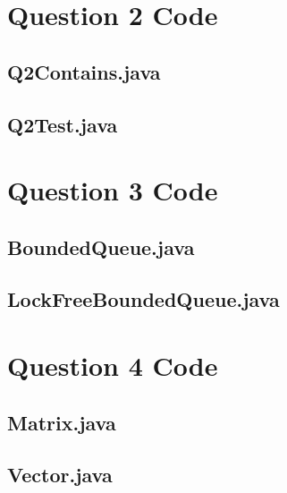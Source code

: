 \documentclass{article}%
\begin{document}
\newpage  
\begin{appendices}
    \section{Question 2 Code}\label{q2}
    
        \subsection*{Q2Contains.java}\label{q2-contains}
        
        
        \subsection*{Q2Test.java}\label{q2-test}
        
    
    \section{Question 3 Code}\label{q3}
    
        \subsection*{BoundedQueue.java}\label{queue}
        
        
        \subsection*{LockFreeBoundedQueue.java}\label{lock-free-queue}
        
        
    \section{Question 4 Code}\label{q4}
    
        \subsection*{Matrix.java}\label{matrix}
        
        
        \subsection*{Vector.java}\label{vector}
        
        

\end{appendices}
\end{document}
